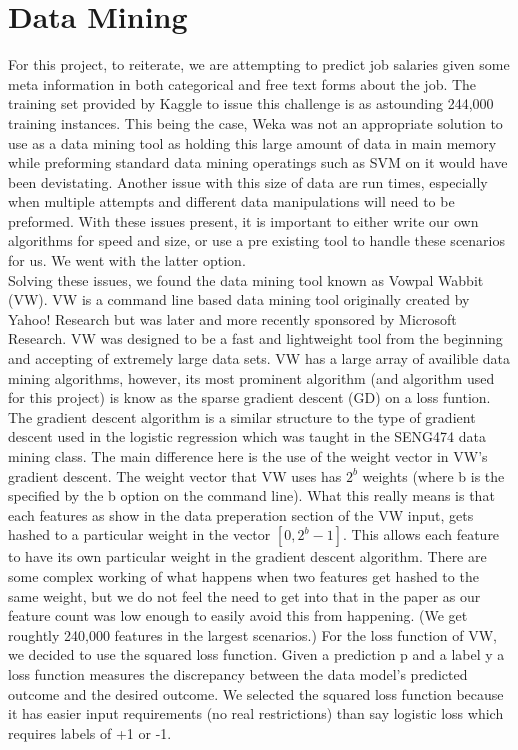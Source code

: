 \section{Data Mining}
\label{sec:dm}

For this project, to reiterate, we are attempting to predict job salaries given some meta information in both categorical and free text forms
about the job. The training set provided by Kaggle to issue this challenge is as astounding 244,000 training instances. This being the case,
Weka was not an appropriate solution to use as a data mining tool as holding this large amount of data in main memory while preforming standard
data mining operatings such as SVM on it would have been devistating. Another issue with this size of data are run times, especially when 
multiple attempts and different data manipulations will need to be preformed. With these issues present, it is important to either write
our own algorithms for speed and size, or use a pre existing tool to handle these scenarios for us. We went with the latter option.\\

Solving these issues, we found the data mining tool known as Vowpal Wabbit (VW). VW is a command line based data mining tool originally
created by Yahoo! Research but was later and more recently sponsored by Microsoft Research. VW was designed to be a fast and lightweight
tool from the beginning and accepting of extremely large data sets. VW has a large array of availible data mining algorithms, however,
its most prominent algorithm (and algorithm used for this project) is know as the sparse gradient descent (GD) on a loss funtion.\\

The gradient descent algorithm is a similar structure to the type of gradient descent used in the logistic regression which was taught
in the SENG474 data mining class. The main difference here is the use of the weight vector in VW's gradient descent. The weight vector
that VW uses has $2^b$ weights (where b is the specified by the b option on the command line). What this really means is that each features
as show in the data preperation section of the VW input, gets hashed to a particular weight in the vector $[0, 2^b-1]$. This allows each
feature to have its own particular weight in the gradient descent algorithm. There are some complex working of what happens when two
features get hashed to the same weight, but we do not feel the need to get into that in the paper as our feature count was low enough
to easily avoid this from happening. (We get roughtly 240,000 features in the largest scenarios.) For the loss function of VW, we decided
to use the squared loss function. Given a prediction p and a label y a loss function measures the discrepancy between the data model's
predicted outcome and the desired outcome. We selected the squared loss function because it has easier input requirements (no real
restrictions) than say logistic loss which requires labels of +1 or -1.\\

